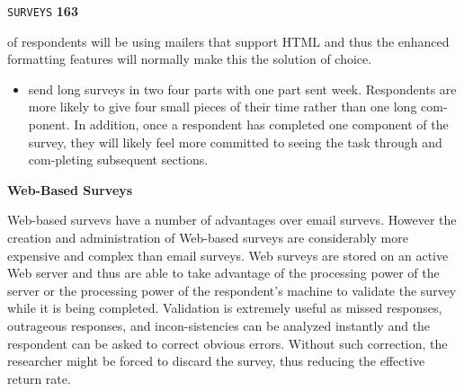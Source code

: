 \documentclass{article}
\begin{document}
\begin{flushright}
 \texttt{SURVEYS} \hspace*{1cm} \textbf{163}
\end{flushright}

\vspace*{0.5cm}
of respondents will be using mailers that support HTML and thus the enhanced formatting features will normally make this the solution of choice.\\
\begin{itemize}
  \item send long surveys in two four parts with one part sent week. Respondents are more likely to give four small pieces of their time rather than one long com-ponent. In addition, once a respondent has completed one component of the survey, they will likely feel more committed to seeing the task through and com-pleting subsequent sections.\\
\end{itemize}

\vspace*{0.4cm}
\large{
\textbf{Web-Based Surveys}
}

\vspace*{0.2cm}
Web-based survevs have a number of advantages over email survevs. However the creation and administration of Web-based surveys are considerably more expensive and complex than email surveys. Web surveys are stored on an active Web server and thus are able to take advantage of the processing power of the server or the processing power of the respondent's machine to validate the survey while it is being completed. Validation is extremely useful as missed responses, outrageous responses, and incon-sistencies can be analyzed instantly and the respondent can be asked to correct obvious errors. Without such correction, the researcher might be forced to discard the survey, thus reducing the effective return rate.\\
\end{document}
